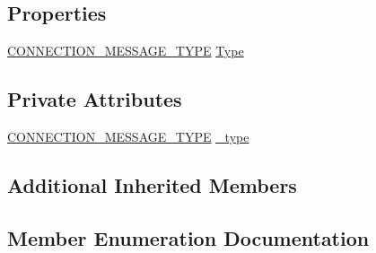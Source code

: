 \subsection*{Properties}
\begin{DoxyCompactItemize}
\item 
\hyperlink{class_web_analyzer_1_1_models_1_1_message_model_1_1_connection_message_a0b8ebc456d3aed9c51235f2a1a1a1cdb}{C\+O\+N\+N\+E\+C\+T\+I\+O\+N\+\_\+\+M\+E\+S\+S\+A\+G\+E\+\_\+\+T\+Y\+P\+E} \hyperlink{class_web_analyzer_1_1_models_1_1_message_model_1_1_connection_message_a74c569109e3a9d19130c36fa9628a5f5}{Type}
\end{DoxyCompactItemize}
\subsection*{Private Attributes}
\begin{DoxyCompactItemize}
\item 
\hyperlink{class_web_analyzer_1_1_models_1_1_message_model_1_1_connection_message_a0b8ebc456d3aed9c51235f2a1a1a1cdb}{C\+O\+N\+N\+E\+C\+T\+I\+O\+N\+\_\+\+M\+E\+S\+S\+A\+G\+E\+\_\+\+T\+Y\+P\+E} \hyperlink{class_web_analyzer_1_1_models_1_1_message_model_1_1_connection_message_abb086bc753b39762aede8191821e72cb}{\+\_\+type}
\end{DoxyCompactItemize}
\subsection*{Additional Inherited Members}


\subsection{Member Enumeration Documentation}
\hypertarget{class_web_analyzer_1_1_models_1_1_message_model_1_1_connection_message_a0b8ebc456d3aed9c51235f2a1a1a1cdb}{}
